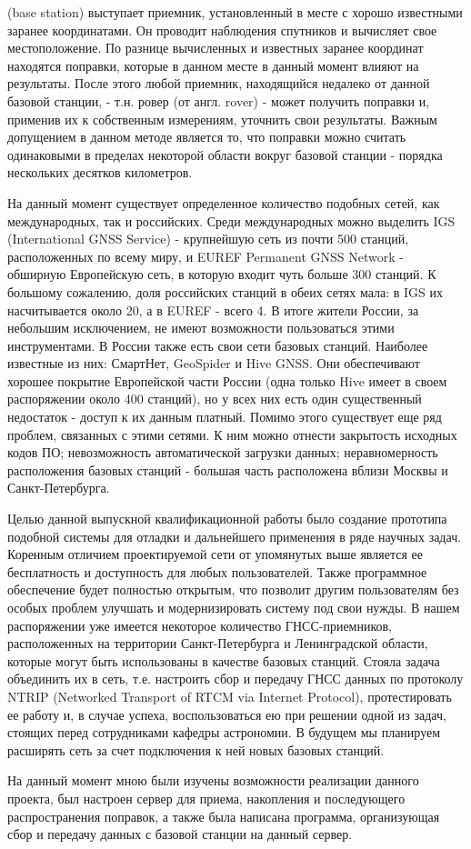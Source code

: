 \documentclass[a4paper,12pt]{report}
\begin{document}
(base station) выступает приемник, установленный в месте с хорошо известными заранее координатами. Он проводит наблюдения спутников и 
вычисляет свое местоположение. По разнице вычисленных и известных заранее координат находятся поправки, которые в данном месте в данный 
момент влияют на результаты. После этого любой приемник, находящийся недалеко от данной базовой станции, - т.н. ровер (от англ. rover) - 
может получить поправки и, применив их к собственным измерениям, уточнить свои результаты. Важным допущением в данном методе является то, 
что поправки можно считать одинаковыми в пределах некоторой области вокруг базовой станции - порядка нескольких десятков километров. \par
На данный момент существует определенное количество подобных сетей, как международных, так и российских. Среди международных можно 
выделить IGS (International GNSS Service) - крупнейшую сеть из почти 500 станций, расположенных по всему миру, и EUREF Permanent GNSS 
Network - обширную Европейскую сеть, в которую входит чуть больше 300 станций. К большому сожалению, доля российских станций в обеих 
сетях мала: в IGS их насчитывается около 20, а в EUREF - всего 4. В итоге жители России, за небольшим исключением, не имеют возможности 
пользоваться этими инструментами. В России также есть свои сети базовых станций. Наиболее известные из них: СмартНет, GeoSpider и Hive GNSS.
Они обеспечивают хорошее покрытие Европейской части России (одна только Hive имеет в своем распоряжении около 400 станций), но у всех 
них есть один существенный недостаток - доступ к их данным платный. Помимо этого существует еще ряд проблем, связанных с этими сетями. 
К ним можно отнести закрытость исходных кодов ПО; невозможность автоматической загрузки данных; неравномерность расположения базовых 
станций - большая часть расположена вблизи Москвы и Санкт-Петербурга. \par
Целью данной выпускной квалификационной работы было создание прототипа подобной системы для отладки и дальнейшего применения в ряде
научных задач. Коренным отличием проектируемой сети от упомянутых выше является ее бесплатность и доступность для любых пользователей. 
Также программное обеспечение будет полностью открытым, что позволит другим пользователям без особых проблем улучшать и модернизировать 
систему под свои нужды.
В нашем распоряжении уже имеется некоторое количество ГНСС-приемников, расположенных на территории Санкт-Петербурга и Ленинградской
области, которые могут быть использованы в качестве базовых станций. Стояла задача объединить их в сеть, т.е. настроить сбор и передачу 
ГНСС данных по протоколу NTRIP (Networked Transport of RTCM via Internet Protocol), протестировать ее работу и, в случае успеха, 
воспользоваться ею при решении одной из задач, стоящих перед сотрудниками кафедры астрономии. В будущем мы планируем расширять сеть 
за счет подключения к ней новых базовых станций. \par
На данный момент мною были изучены возможности реализации данного проекта, был настроен сервер 
для приема, накопления и последующего распространения поправок, а также была написана программа, организующая сбор и передачу данных с 
базовой станции на данный сервер.
\newpage
\end{document}

